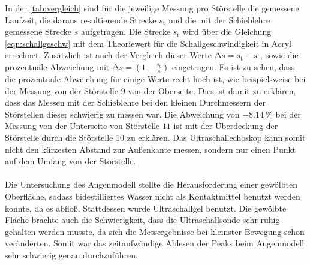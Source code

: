 \noindent In der \autoref{tab:vergleich} sind für die jeweilige Messung pro Störstelle die gemessene Laufzeit, die daraus resultierende Strecke $s_{\text{t}}$ und 
die mit der Schieblehre gemessene Strecke $s$ aufgetragen. Die Strecke $s_{\text{t}}$ wird über die Gleichung \eqref{eqn:schallgeschw} mit dem Theoriewert für 
die Schallgeschwindigkeit in Acryl errechnet. Zusätzlich ist auch der Vergleich dieser Werte $ \increment s = s_{\text{t}} - s $ , sowie die 
prozentuale Abweichung mit $ \increment s = (1-\frac{s_{\text{t}}}{s})$ eingetragen.
Es ist zu sehen, dass die prozentuale Abweichung für einige Werte recht hoch ist, wie beispielsweise bei der Messung von der Störstelle $9$ von der Oberseite.
Dies ist damit zu erklären, dass das Messen mit der Schieblehre bei den kleinen Durchmessern der Störstellen dieser schwierig zu messen war. 
Die Abweichung von $\SI{-8.14}{\percent}$ bei der Messung von der Unterseite von Störstelle $11$ ist mit der Überdeckung der Störstelle durch die Störstelle $10$ 
zu erklären. Das Ultraschallechoskop kann somit nicht den kürzesten Abstand zur Außenkante messen, sondern nur einen Punkt auf dem Umfang von der Störstelle. \\
\\
\noindent Die Untersuchung des Augenmodell stellte die Herausforderung einer gewölbten Oberfläche, sodass bidestilliertes Wasser nicht als Kontaktmittel benutzt 
werden konnte, da es abfloß. Stattdessen wurde Ultraschallgel benutzt. Die gewölbte Fläche brachte auch die Schwierigkeit, dass die Ultraschallsonde sehr ruhig 
gehalten werden musste, da sich die Messergebnisse bei kleinster Bewegung schon veränderten. Somit war das zeitaufwändige Ablesen der Peaks beim Augenmodell
sehr schwierig genau durchzuführen. 